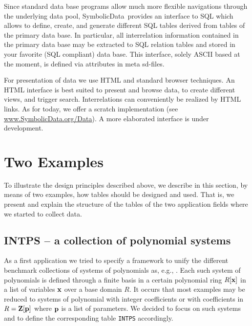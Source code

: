 \documentclass[11pt,a4paper]{article}
\newcommand{\SD}{{\sc Symbolic\-Data}}
\begin{document}


Since standard data base programs allow much more flexible
navigations through the underlying data pool, \SD\ provides an interface to
SQL which allows to define, create, and generate different SQL tables
derived from tables of the primary data base. In particular, all
interrelation information contained in the primary data base may be
extracted to SQL relation tables and stored in your favorite (SQL
compliant) data base.  This interface, solely ASCII based at the
moment, is defined via attributes in meta sd-files.

For presentation of data we use HTML and standard browser techniques.
An HTML interface is best suited to present and browse data, to create
different views, and trigger search. Interrelations can conveniently
be realized by HTML links. As for today, we offer a scratch
implementation (see \url{www.SymbolicData.org/Data}).  A more
elaborated interface is under development. 

\section{Two Examples}

To illustrate the design principles described above, we describe in
this section, by means of two examples, how tables should be designed
and used. That is, we present and explain  the structure of the tables
of the two application fields where we started to collect data.

\subsection{INTPS -- a collection of polynomial systems}

As a first application we tried to specify a framework to unify the
different benchmark collections of systems of polynomials as, e.g.,
\cite{Bini, Boege_86a, Czapor_86a, PoSSo, Wang_92a, Wang_96a}.  Each
such system of polynomials is defined through a finite basis in a
certain polynomial ring $R[{\bf x}]$ in a list of variables ${\bf x}$
over a base domain $R$. It occurs that most examples may be reduced to
systems of polynomial with integer coefficients or with coefficients
in $R={\bf Z}[{\bf p}]$ where ${\bf p}$ is a list of parameters. We
decided to focus on such systems and to define the corresponding table
{\tt INTPS} accordingly.
\end{document}
